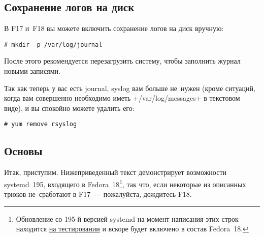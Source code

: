 \documentclass[10pt,oneside,a4paper]{article}
\begin{document}
\subsection{Сохранение логов на диск}

В F17 и~F18 вы можете включить сохранение логов на диск вручную:
\begin{Verbatim}
# mkdir -p /var/log/journal
\end{Verbatim}
После этого рекомендуется перезагрузить систему, чтобы заполнить журнал новыми
записями.

Так как теперь у вас есть journal, syslog вам больше не~нужен (кроме ситуаций,
когда вам совершенно необходимо иметь +/var/log/messages+ в текстовом виде), и
вы спокойно можете удалить его:
\begin{Verbatim}
# yum remove rsyslog
\end{Verbatim}

\subsection{Основы}

Итак, приступим. Нижеприведенный текст демонстрирует возможности systemd~195,
входящего в Fedora~18\footnote{Обновление со 195-й версией systemd на момент
написания этих строк находится
\href{https://admin.fedoraproject.org/updates/FEDORA-2012-16709/systemd-195-1.fc18}{на
тестировании} и вскоре будет включено в состав Fedora~18.}, так что, если
некоторые из описанных трюков не~сработают в F17~--- пожалуйста, дождитесь F18.
\end{document}
